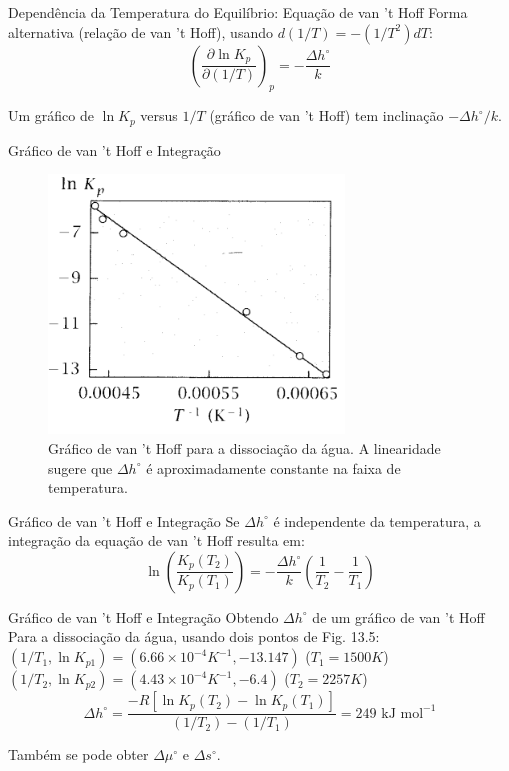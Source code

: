 \documentclass{beamer}
\begin{document}
\begin{frame}{Dependência da Temperatura do Equilíbrio: Equação de van 't Hoff}
    Forma alternativa (relação de van 't Hoff), usando $d(1/T) = -(1/T^2)dT$:
    $$ \left(\frac{\partial \ln K_p}{\partial (1/T)}\right)_p = -\frac{\Delta h^{\circ}}{k} $$
    
    Um gráfico de $\ln K_p$ versus $1/T$ (gráfico de van 't Hoff) tem inclinação $-\Delta h^{\circ}/k$.
\end{frame}

\begin{frame}{Gráfico de van 't Hoff e Integração}
    \begin{figure}
    \centering
    \includegraphics[width=0.7\textwidth]{figs/hoff.png}
    \caption{Gráfico de van 't Hoff para a dissociação da água. A linearidade sugere que $\Delta h^{\circ}$ é aproximadamente constante na faixa de temperatura.}
    \end{figure}
    
\end{frame}

\begin{frame}{Gráfico de van 't Hoff e Integração}
    Se $\Delta h^{\circ}$ é independente da temperatura, a integração da equação de van 't Hoff resulta em:
    $$ \ln\left(\frac{K_p(T_2)}{K_p(T_1)}\right) = -\frac{\Delta h^{\circ}}{k}\left(\frac{1}{T_2} - \frac{1}{T_1}\right) $$
     
\end{frame}

\begin{frame}{Gráfico de van 't Hoff e Integração}
    Obtendo $\Delta h^{\circ}$ de um gráfico de van 't Hoff 
        Para a dissociação da água, usando dois pontos de Fig. 13.5:
        $(1/T_1, \ln K_{p1}) = (6.66 \times 10^{-4} K^{-1}, -13.147)$ ($T_1=1500K$)
        $(1/T_2, \ln K_{p2}) = (4.43 \times 10^{-4} K^{-1}, -6.4)$ ($T_2=2257K$)
        $$ \Delta h^{\circ} = \frac{-R[\ln K_p(T_2) - \ln K_p(T_1)]}{(1/T_2) - (1/T_1)} = 249 \text{ kJ mol}^{-1} $$
        
        Também se pode obter $\Delta\mu^{\circ}$ e $\Delta s^{\circ}$.
\end{frame}
\end{document}
